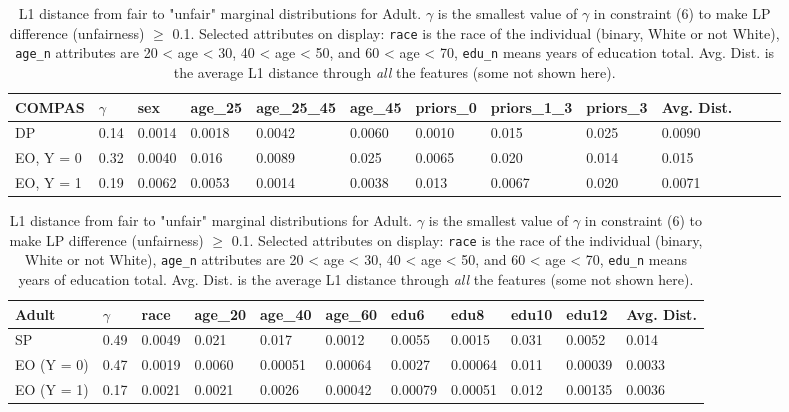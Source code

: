 \documentclass[11pt]{article}
\begin{document}
\begin{table}[htbp]
\small
\captionsetup{font=small}
\begin{tabular}{lllllllllllll}
\hline
COMPAS & $\gamma$ & sex    & age\_25 & age\_25\_45 & age\_45 & priors\_0 & priors\_1\_3 & priors\_3 & Avg. Dist.\\ \hline
DP        & 0.14 & 0.0014 & 0.0018  & 0.0042      & 0.0060  & 0.0010    & 0.015        & 0.025    & 0.0090 \\ \hline
EO, Y = 0 & 0.32 & 0.0040 & 0.016   & 0.0089      & 0.025   & 0.0065    & 0.020        & 0.014    & 0.015     \\ \hline
EO, Y = 1 & 0.19 & 0.0062 & 0.0053  & 0.0014      & 0.0038  & 0.013     & 0.0067       & 0.020    & 0.0071    \\ \hline
\end{tabular}
\caption{L1 distance from fair to "unfair" marginal distributions for COMPAS. $\gamma$ is the smallest value of $\gamma$ in constraint (6) to make LP difference (unfairness) $\geq$ 0.1. Selected attributes on display: \texttt{sex} is the sex of the individual, \texttt{age\_n} attributes are age < 25, 25 < age < 45, and age > 45, \texttt{priors\_n} means prior crimes = 0, 1 < prior crimes < 3, and 3 < prior crimes. Avg. Dist. is the average L1 distance through \textit{all} the features (some not shown here). } 
\label{tab:compas_results}

\medskip 

\begin{tabular}{lllllllllll}
\hline
Adult      & $\gamma$ & race   & age\_20 & age\_40 & age\_60 & edu6    & edu8    & edu10 & edu12 & Avg. Dist.  \\ \hline
SP         & 0.49  & 0.0049 & 0.021   & 0.017   & 0.0012  & 0.0055  & 0.0015  & 0.031 & 0.0052 & 0.014 \\ \hline
EO (Y = 0) & 0.47  & 0.0019 & 0.0060  & 0.00051 & 0.00064 & 0.0027  & 0.00064 & 0.011 & 0.00039 & 0.0033 \\ \hline
EO (Y = 1) & 0.17  & 0.0021 & 0.0021  & 0.0026  & 0.00042 & 0.00079 & 0.00051 & 0.012 & 0.00135 & 0.0036 \\ \hline
\end{tabular}
\caption{L1 distance from fair to "unfair" marginal distributions for Adult. $\gamma$ is the smallest value of $\gamma$ in constraint (6) to make LP difference (unfairness) $\geq$ 0.1. Selected attributes on display: \texttt{race} is the race of the individual (binary, White or not White), \texttt{age\_n} attributes are 20 < age < 30, 40 < age < 50, and 60 < age < 70, \texttt{edu\_n} means years of education total. Avg. Dist. is the average L1 distance through \textit{all} the features (some not shown here).}
\label{tab:my-table}
\end{table}
\end{document}
